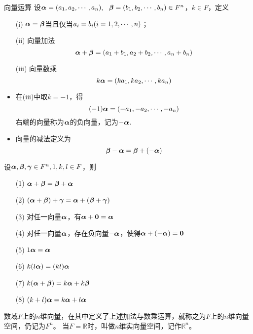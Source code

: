 \begin{frame}
\begin{dingyi}{向量运算}
  设$\boldsymbol{\alpha}=(a_1,a_2,\cdots,a_n),~~\boldsymbol{\beta}=(b_1,b_2,\cdots,b_n)\in F^n$，$k\in F$，定义
  \begin{enumerate}
  \item[(i)]
    $\boldsymbol{\alpha}=\boldsymbol{\beta}$当且仅当$a_i=b_i(i=1,2,\cdots,n)$；
  \item[(ii)] 向量加法
    $$
    \boldsymbol{\alpha}+\boldsymbol{\beta}=(a_1+b_1,a_2+b_2,\cdots,a_n+b_n)
    $$
  \item[(iii)] 向量数乘
    $$
    k\boldsymbol{\alpha}=(ka_1,ka_2,\cdots,ka_n)
    $$
  \end{enumerate}
\end{dingyi}

\begin{itemize}
\item 在(iii)中取$k=-1$，得
  $$
  (-1)\boldsymbol{\alpha} = (-a_1,-a_2,\cdots,-a_n)
  $$
  右端的向量称为$\boldsymbol{\alpha}$的负向量，记为$-\boldsymbol{\alpha}$. 
\item 向量的减法定义为
  $$
  \boldsymbol{\beta}-\boldsymbol{\alpha} = \boldsymbol{\beta} + (-\boldsymbol{\alpha})
  $$
\end{itemize}
\end{frame}

\begin{frame}
\begin{dingyi}
  设$\boldsymbol{\alpha},\boldsymbol{\beta},\boldsymbol{\gamma}\in F^n, 1,k,l\in F$，则
  \begin{itemize}
  \item[(1)] $\boldsymbol{\alpha}+\boldsymbol{\beta}=\boldsymbol{\beta}+\boldsymbol{\alpha}$
  \item[(2)] $(\boldsymbol{\alpha}+\boldsymbol{\beta})+\boldsymbol{\gamma}=\boldsymbol{\alpha}+(\boldsymbol{\beta}+\boldsymbol{\gamma})$
  \item[(3)] 对任一向量$\boldsymbol{\alpha}$，有$\boldsymbol{\alpha}+\boldsymbol{0}=\boldsymbol{\alpha}$
  \item[(4)] 对任一向量$\boldsymbol{\alpha}$，存在负向量$-\boldsymbol{\alpha}$，使得$\boldsymbol{\alpha}+(-\boldsymbol{\alpha})=\boldsymbol{0}$
  \item[(5)] $1\boldsymbol{\alpha}=\boldsymbol{\alpha}$
  \item[(6)] $k(l\boldsymbol{\alpha})=(kl)\boldsymbol{\alpha}$
  \item[(7)] $k(\boldsymbol{\alpha}+\boldsymbol{\beta})=k\boldsymbol{\alpha}+k\boldsymbol{\beta}$
  \item[(8)] $(k+l)\boldsymbol{\alpha}=k\boldsymbol{\alpha}+l\boldsymbol{\alpha}$
  \end{itemize}
\end{dingyi}
\end{frame}

\begin{frame}
\begin{dingyi}[向量空间]
  数域$F$上的$n$维向量，在其中定义了上述加法与数乘运算，就称之为$F$上的$n$维向量空间，仍记为$F^n$。
  当$F=\mathbb R$时，叫做$n$维实向量空间，记作$\mathbb R^n$。
\end{dingyi}
\end{frame}

